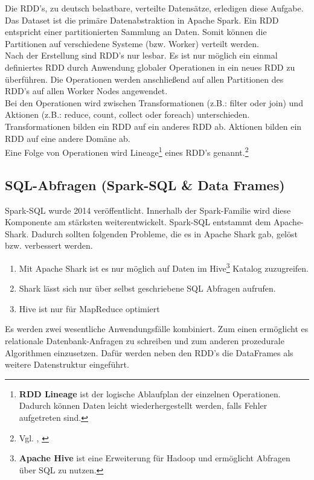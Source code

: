 \noindent
Die RDD's, zu deutsch belastbare, verteilte Datensätze, erledigen diese Aufgabe. Das Dataset ist die primäre Datenabstraktion in Apache Spark. 
Ein RDD entspricht einer partitionierten Sammlung an Daten. Somit können die Partitionen auf verschiedene Systeme (bzw. Worker) verteilt werden.  \\
Nach der Erstellung sind RDD's nur lesbar. Es ist nur möglich ein einmal definiertes RDD durch Anwendung globaler Operationen in ein neues RDD zu überführen. Die Operationen werden anschließend auf allen Partitionen des RDD's auf allen Worker Nodes angewendet. \\
\noindent
Bei den Operationen wird zwischen Transformationen (z.B.: filter oder join) und Aktionen (z.B.: reduce, count, collect oder foreach) unterschieden. Transformationen bilden ein RDD auf ein anderes RDD ab. Aktionen bilden ein RDD auf eine andere Domäne ab.\\ %
\noindent
Eine Folge von Operationen wird Lineage\footnote{\textbf{RDD Lineage} ist der logische Ablaufplan der einzelnen Operationen. Dadurch können Daten leicht wiederhergestellt werden, falls Fehler aufgetreten sind.} eines RDD's genannt.\footnote{Vgl. \cite{ZC+12}, \cite[11]{AAWS15}}



\newpage
\subsection{SQL-Abfragen (Spark-SQL \& Data Frames)}\label{sec_sparksql}

Spark-SQL wurde 2014 veröffentlicht. Innerhalb der Spark-Familie wird diese Komponente am stärksten weiterentwickelt. Spark-SQL entstammt dem Apache-Shark. Dadurch sollten folgenden Probleme, die es in Apache Shark gab, gelöst bzw. verbessert werden.
\begin{enumerate}
	\item Mit Apache Shark ist es nur möglich auf Daten im Hive\footnote{\textbf{Apache Hive} ist eine Erweiterung für Hadoop und ermöglicht Abfragen über SQL zu nutzen.} Katalog zuzugreifen. 
	\item Shark lässt sich nur über selbst geschriebene SQL Abfragen aufrufen. 
	\item Hive ist nur für MapReduce optimiert
\end{enumerate}

\noindent
Es werden zwei wesentliche Anwendungsfälle kombiniert. Zum einen ermöglicht es relationale Datenbank-Anfragen zu schreiben und zum anderen prozedurale Algorithmen einzusetzen. 
Dafür werden neben den RDD's die DataFrames als weitere Datenstruktur eingeführt.\\

